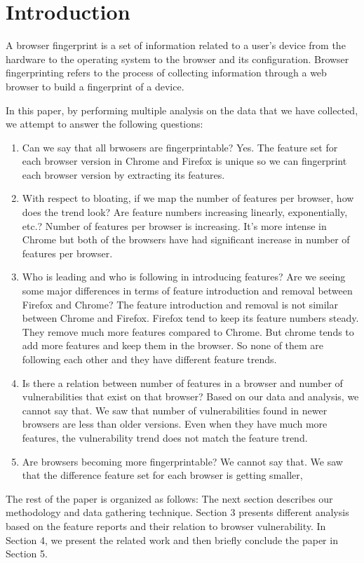 \section{Introduction}
\label{sec:introduction}

A browser fingerprint is a set of information related to a user’s device from the hardware to
the operating system to the browser and its configuration. Browser fingerprinting refers to the
process of collecting information through a web browser to build a fingerprint of a device.

In this paper, by performing multiple analysis on the data that we have collected, we attempt to answer
the following questions:

\begin{enumerate}
  \item Can we say that all brwosers are fingerprintable?
  Yes. The feature set for each browser version in Chrome and Firefox is unique so we can fingerprint each browser version by extracting its features.
  \item With respect to bloating, if we map the number of features per browser, how does the trend look? Are feature numbers increasing linearly, exponentially, etc.? Number of features per browser is increasing. It's more intense in Chrome but both of the browsers have had significant increase in number of features per browser.
  \item Who is leading and who is following in introducing features? Are we seeing some major differences in terms of feature introduction and removal between Firefox and Chrome? The feature introduction and removal is not similar between Chrome and Firefox. Firefox tend to keep its feature numbers steady. They remove much more features compared to Chrome. But chrome tends to add more features and keep them in the browser. So none of them are following each other and they have different feature trends.
  \item Is there a relation between number of features in a browser and number of vulnerabilities that exist on that browser? Based on our data and analysis, we cannot say that. We saw that number of vulnerabilities found in newer browsers are less than older versions. Even when they have much more features, the vulnerability trend does not match the feature trend. 
  \item Are browsers becoming more fingerprintable? We cannot say that. We saw that the difference feature set for each browser is getting smaller, 
\end{enumerate}

The rest of the paper is organized as follows: The next section describes our
methodology and data gathering technique. Section 3 presents different analysis based on the feature reports and their relation to browser vulnerability. In
Section 4, we present the related work and then briefly conclude the paper in
Section 5.

